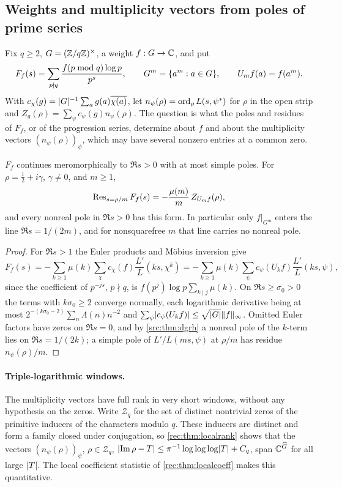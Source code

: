 \subsection{Weights and multiplicity vectors from poles of prime series}\label{rec:sec:poles}

Fix $q\ge2$, $G=(\mathbb{Z}/q\mathbb{Z})^\times$, a weight $f:G\to\mathbb{C}$, and put
\[
 F_f(s)=\sum_{p\nmid q}\frac{f(p\bmod q)\log p}{p^s},\qquad G^m=\{a^m:a\in G\},\qquad U_mf(a)=f(a^m).
\]
With $c_\chi(g)=\lvert G\rvert^{-1}\sum_ag(a)\overline{\chi(a)}$, let $n_\psi(\rho)=\operatorname{ord}_\rho L(s,\psi^*)$ for
$\rho$ in the open strip and $Z_g(\rho)=\sum_\psi c_\psi(g)n_\psi(\rho)$. The question is what the
poles and residues of $F_f$, or of the progression series, determine about $f$ and about the
multiplicity vectors $(n_\psi(\rho))_\psi$, which may have several nonzero entries at a common
zero.

\begin{proposition}\label{rec:prop:powerline}
$F_f$ continues meromorphically to $\Re s>0$ with at most simple poles. For $\rho=\tfrac12+i\gamma$,
$\gamma\ne0$, and $m\ge1$,
\[
 \operatorname{Res}_{s=\rho/m}F_f(s)=-\frac{\mu(m)}m\,Z_{U_mf}(\rho),
\]
and every nonreal pole in $\Re s>0$ has this form. In particular only $f|_{G^m}$ enters the line
$\Re s=1/(2m)$, and for nonsquarefree $m$ that line carries no nonreal pole.
\end{proposition}

\begin{proof}
For $\Re s>1$ the Euler products and M\"obius inversion give
\[
 F_f(s)=-\sum_{k\ge1}\mu(k)\sum_\chi c_\chi(f)\frac{L'}L(ks,\chi^k)
 =-\sum_{k\ge1}\mu(k)\sum_\psi c_\psi(U_kf)\frac{L'}L(ks,\psi),
\]
since the coefficient of $p^{-js}$, $p\nmid q$, is $f(p^j)\log p\sum_{k\mid j}\mu(k)$. On
$\Re s\ge\sigma_0>0$ the terms with $k\sigma_0\ge2$ converge normally, each logarithmic derivative
being at most $2^{-(k\sigma_0-2)}\sum_n\Lambda(n)n^{-2}$ and $\sum_\psi\lvert c_\psi(U_kf)\rvert\le\sqrt{\lvert G\rvert}\lVert f\rVert_\infty$.
Omitted Euler factors have zeros on $\Re s=0$, and by \cref{src:thm:dgrh} a nonreal pole of the
$k$-term lies on $\Re s=1/(2k)$; a simple pole of $L'/L(ms,\psi)$ at $\rho/m$ has residue
$n_\psi(\rho)/m$.
\end{proof}

\paragraph{Triple-logarithmic windows.}
The multiplicity vectors have full rank in very short windows, without any hypothesis on the
zeros. Write $\mathcal Z_q$ for the set of distinct nontrivial zeros of the primitive inducers of the
characters modulo $q$. These inducers are distinct and form a family
closed under conjugation, so \cref{rec:thm:localrank} shows that the vectors $(n_\psi(\rho))_\psi$,
$\rho\in\mathcal Z_q$, $\lvert\operatorname{Im}\rho-T\rvert\le\pi^{-1}\log\log\log\lvert T\rvert+C_q$, span $\mathbb{C}^{\widehat G}$ for all large $\lvert T\rvert$. The
local coefficient statistic of \cref{rec:thm:localcoeff} makes this quantitative.

